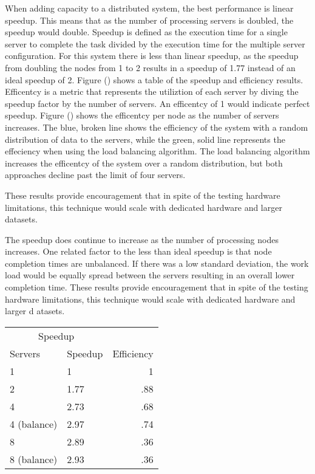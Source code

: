\documentclass{article}
\begin{document}
\begin{multicols}{2}
When adding capacity to a distributed system, the best performance is linear speedup.  This means that as the number of processing servers is doubled, the speedup would double. Speedup is defined as the execution time for a single server to complete the task divided by the execution time for the multiple server configuration.  For this system there is less than linear speedup, as the speedup from doubling the nodes from 1 to 2 results in a speedup of 1.77 instead of an ideal speedup of 2.  Figure () shows a table of the speedup and efficiency results.  Efficentcy is a metric that represents the utiliztion of each server by diving the speedup factor by the number of servers.  An efficentcy of 1 would indicate perfect speedup.  Figure () shows the efficentcy per node as the number of servers increases.  The blue, broken line shows the efficiency of the system with a random distribution of data to the servers, while the green, solid line represents the effeciency when using the load balancing algorithm.  The load balancing algorithm increases the efficentcy of the system over a random distribution, but both approaches decline past the limit of four servers.

These results provide encouragement that in spite of the testing hardware limitations, this technique would scale with dedicated hardware and larger datasets.


The speedup does continue to increase as the number of processing nodes increases. One related factor to the less than ideal speedup is that node completion times are unbalanced. If there was a low standard deviation, the work load would be equally spread between the servers resulting in an overall lower completion time.  %
These results provide encouragement that in spite of the testing hardware limitations, this technique would scale with dedicated hardware and larger d
atasets.




\begin{tabular}{llr}
\hline
\multicolumn{2}{c}{Speedup} \\
\cline{1-2}
Servers    & Speedup & Efficiency  \\
\hline
1     &  1  & 1   \\
2     &   1.77  & .88  \\
4     &   2.73  & .68 \\
4 (balance) & 2.97 & .74     \\
8 &  2.89   & .36  \\
8 (balance) & 2.93 & .36      \\
\hline
\end{tabular}



\end{multicols}
\end{document}
